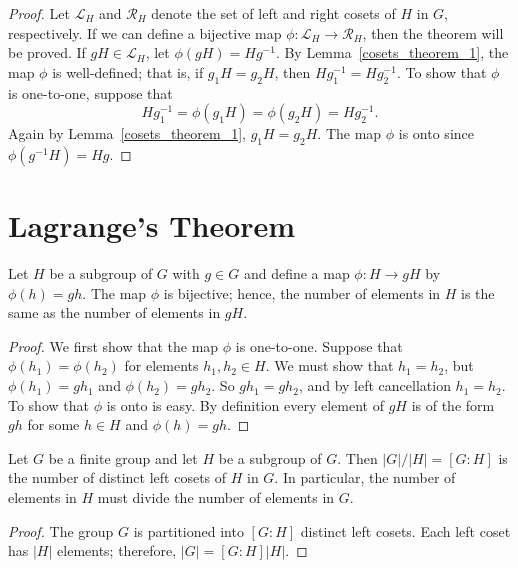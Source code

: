  
\begin{proof}
Let ${\mathcal L}_H$\label{notesetleft} and  ${\mathcal R}_H$\label{notesetright} denote the set of left and right cosets of $H$ in $G$, respectively.  If we can define a bijective map $\phi :  {\mathcal L}_H \rightarrow {\mathcal R}_H$, then the theorem will be proved.  If $gH \in {\mathcal L}_H$, let $\phi( gH ) = Hg^{-1}$.  By Lemma~\ref{cosets_theorem_1}, the map $\phi$ is well-defined; that is, if $g_1 H = g_2 H$, then $H g_1^{-1} = H g_2^{-1}$.  To show that $\phi$ is one-to-one, suppose that 
\[
H g_1^{-1} = \phi( g_1 H ) = \phi( g_2 H ) = H g_2^{-1}.
\]
Again by Lemma~\ref{cosets_theorem_1}, $g_1 H = g_2 H$.  The map $\phi$ is onto since $\phi(g^{-1} H ) = H g$. 
\hspace*{1in}
\end{proof}
 
 
\section{Lagrange's Theorem}

\begin{proposition}\label{cosets_theorem_4}
Let $H$ be a subgroup of $G$ with $g \in G$ and define a map $\phi:H \rightarrow gH$ by $\phi(h) = gh$.  The map $\phi$ is bijective; hence, the number of elements in $H$ is the same as the number of elements in $gH$. 
\end{proposition}
 
\begin{proof}
We first show that the map $\phi$ is one-to-one.  Suppose that $\phi(h_1)  = \phi(h_2)$ for elements $h_1, h_2 \in H$.  We must show that $h_1 =  h_2$, but $\phi(h_1) = gh_1$ and $\phi(h_2) = gh_2$.  So $gh_1 = gh_2$,  and by left cancellation $h_1= h_2$.  To show that $\phi$ is onto is easy.  By definition every element of $gH$ is of the form $gh$ for some $h \in H$ and $\phi(h) = gh$. 
\end{proof}

\begin{theorem}[Lagrange]\label{cosets_theorem_5}
Let $G$ be a finite group and let $H$ be a subgroup of $G$.  Then $|G|/|H| = [G : H]$ is the number of distinct left cosets of $H$ in $G$.  In particular, the number of elements in $H$ must divide the number of elements in $G$. 
\end{theorem}

\begin{proof}
The group $G$ is partitioned into $[G : H]$ distinct left cosets.  Each left coset has $|H|$ elements; therefore, $|G| = [G : H] |H|$.
\end{proof}

